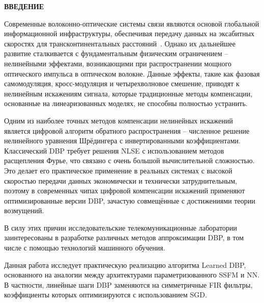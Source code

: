\newpage
\begin{center}
	\textbf{ВВЕДЕНИЕ}
\end{center}

Современные волоконно-оптические системы связи являются основой глобальной информационной инфраструктуры, обеспечивая передачу данных на эксабитных скоростях для трансконтинентальных расстояний~\cite{hecht2004city}.
Однако их дальнейшее развитие сталкивается с фундаментальным физическим ограничением -- нелинейными эффектами, возникающими при распространении мощного оптического импульса в оптическом волокне.
Данные эффекты, такие как фазовая самомодуляция, кросс-модуляция и четырехволновое смешение, приводят к нелинейным искажениям сигнала, которые традиционные методы компенсации, основанные на линеаризованных моделях, не способны полностью устранить.

Одним из наиболее точных методов компенсации нелинейных искажений является цифровой алгоритм обратного распространения -- численное решение нелинейного уравнения Шрёдингера с инвертированными коэффициентами.
Классический DBP требует решения NLSE с использованием методов расщепления Фурье, что связано с очень большой вычислительной сложностью.
Это делает его практическое применение в реальных системах с высокой скоростью передачи данных экономически и технически затруднительным,
поэтому в современных чипах цифровой компенсации искажений применяют оптимизированные версии DBP, зачастую совмещённые с достижениями теории возмущений.

В силу этих причин исследовательские телекомуникационные лаборатории заинтересованы в разработке различных методов аппроксимации DBP, в том числе с помощью технологий машинного обучения.

Данная работа исследует практическую реализацию алгоритма Learned DBP, основанного на аналогии между архитектурами параметризованного SSFM и NN.
В частности, линейные шаги DBP заменяются на симметричные FIR фильтры, коэффициенты которых оптимизируются с использованием SGD.
